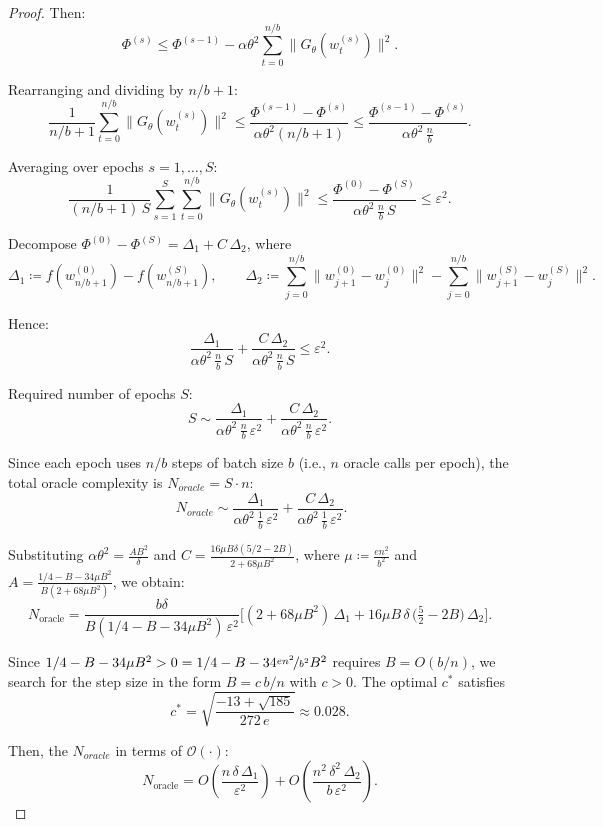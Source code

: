 \documentclass{article}
\begin{document}
\begin{proof}
Then:
\[
\Phi^{(s)} \leq \Phi^{(s-1)} 
- \alpha\theta^2\sum_{t=0}^{n/b}
\|G_\theta(w_t^{(s)})\|^2.
\]

Rearranging and dividing by $n/b + 1$:
\[
\frac{1}{n/b + 1}\sum_{t=0}^{n/b}
\|G_\theta(w_t^{(s)})\|^2 
\leq \frac{\Phi^{(s-1)} - \Phi^{(s)}}
{\alpha\theta^2(n/b + 1)} 
\leq \frac{\Phi^{(s-1)} - \Phi^{(s)}}
{\alpha\theta^2\,\tfrac{n}{b}}.
\]

Averaging over epochs $s = 1, \ldots, S$:
\[
\frac{1}{(n/b + 1)\,S}\sum_{s=1}^{S}\sum_{t=0}^{n/b}
\|G_\theta(w_t^{(s)})\|^2 
\leq \frac{\Phi^{(0)} - \Phi^{(S)}}
{\alpha\theta^2\,\tfrac{n}{b}\,S} 
\leq \varepsilon^2.
\]

Decompose $\Phi^{(0)} - \Phi^{(S)} = \Delta_1 + C\,\Delta_2$, 
where
\[
\Delta_1 \coloneqq f(w_{n/b+1}^{(0)}) 
- f(w_{n/b+1}^{(S)}), 
\qquad 
\Delta_2 \coloneqq \sum_{j=0}^{n/b}
\|w_{j+1}^{(0)} - w_j^{(0)}\|^2 
- \sum_{j=0}^{n/b}
\|w_{j+1}^{(S)} - w_j^{(S)}\|^2.
\]

Hence:
\[
\frac{\Delta_1}{\alpha\theta^2\,\tfrac{n}{b}\,S} 
+ \frac{C\,\Delta_2}{\alpha\theta^2\,\tfrac{n}{b}\,S} 
\leq \varepsilon^2.
\]

Required number of epochs $S$:
\[
S \sim \frac{\Delta_1}
{\alpha \theta^2\,\tfrac{n}{b}\,\varepsilon^2} 
+ \frac{C\,\Delta_2}
{\alpha\theta^2\,\tfrac{n}{b}\,\varepsilon^2}.
\]

Since each epoch uses $n/b$ steps of batch size $b$ 
(i.e., $n$ oracle calls per epoch), 
the total oracle complexity is 
$N_{oracle} = S \cdot n$:
\[
\ N_{oracle} \sim 
\frac{\Delta_1}
{\alpha \theta^2\,\tfrac{1}{b}\,\varepsilon^2} 
+ \frac{C\,\Delta_2}
{\alpha\theta^2\,\tfrac{1}{b}\,\varepsilon^2}.
\]


Substituting $\alpha\theta^2 = \frac{AB^2}{\delta}$ and 
$C = \frac{16\mu B\delta(5/2 - 2B)}{2 + 68\mu B^2}$, 
where $\mu \coloneqq \frac{en^2}{b^2}$ 
and $A = \frac{1/4 - B - 34\mu B^2}{B(2 + 68\mu B^2)}$, 
we obtain:
\[
N_{\text{oracle}} 
= \frac{b\delta}{B(1/4 - B - 34\mu B^2)\,\varepsilon^2}
\bigg[(2 + 68\mu B^2)\,\Delta_1 
+ 16\mu B\,\delta\,
\Big(\tfrac{5}{2} - 2B\Big)\,\Delta_2\bigg].
\]

Since $1/4 - B - 34\mu B^2 > 0 = 1/4 - B - 34 \nicefrac{en^2}{b^2} B^2$ requires 
$B = O(b/n)$, we search for the 
step size in the form $B = c\,b/n$ with $c > 0$. 
The optimal $c^*$ satisfies 
\[
c^* = \sqrt{\frac{-13 + \sqrt{185}}{272\,e}} 
\approx 0.028.
\]

Then, the $N_{oracle}$ in terms of $\mathcal{O}(\cdot): $
\begin{equation}
\label{eq:oracle-complexity}
N_{\text{oracle}} 
= O\!\left(\frac{n\,\delta\,\Delta_1}{\varepsilon^2}\right) 
+ O\!\left(\frac{n^2\,\delta^2\,\Delta_2}
{b\,\varepsilon^2}\right).
\end{equation}


\end{proof}
\end{document}
